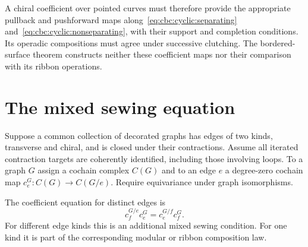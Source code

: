 A chiral coefficient over pointed curves must therefore provide the appropriate pullback and pushforward maps along~\eqref{eq:cbc:cyclic:separating} and~\eqref{eq:cbc:cyclic:nonseparating}, with their support and completion conditions.
Its operadic compositions must agree under successive clutching.
The bordered-surface theorem constructs neither these coefficient maps nor their comparison with its ribbon operations.

\section{The mixed sewing equation}

Suppose a common collection of decorated graphs has edges of two kinds, transverse and chiral, and is closed under their contractions.
Assume all iterated contraction targets are coherently identified, including those involving loops.
To a graph $G$ assign a cochain complex $C(G)$ and to an edge $e$ a degree-zero cochain map $c_e^G:C(G)\to C(G/e)$.
Require equivariance under graph isomorphisms.

The coefficient equation for distinct edges is
\begin{equation}\label{eq:cbc:cyclic:mixed-square}
 c_f^{G/e}c_e^G=c_e^{G/f}c_f^G.
\end{equation}
For different edge kinds this is an additional mixed sewing condition.
For one kind it is part of the corresponding modular or ribbon composition law.

